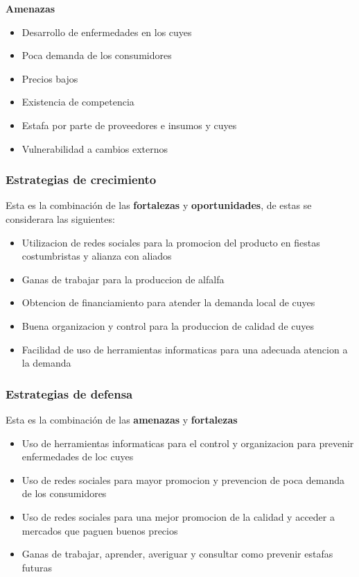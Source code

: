\documentclass[11pt]{article}
\begin{document}
\textbf{Amenazas}
\begin{itemize}
	\item Desarrollo de enfermedades en los cuyes  
	\item Poca demanda de los consumidores
	\item Precios bajos
	\item Existencia de competencia
    \item Estafa por parte de proveedores e insumos y cuyes
	\item Vulnerabilidad a cambios externos
\end{itemize}

\subsubsection{Estrategias de crecimiento}
Esta es la combinación de las \textbf{fortalezas} y \textbf{oportunidades}, de estas se considerara las siguientes:
\begin{itemize}
    \item Utilizacion de redes sociales para la promocion del producto en fiestas costumbristas y alianza con aliados
    \item Ganas de trabajar para la produccion de alfalfa
    \item Obtencion de financiamiento para atender la demanda local de cuyes
    \item Buena organizacion y control para la produccion de calidad de cuyes
    \item Facilidad de uso de herramientas informaticas para una adecuada atencion a la demanda
\end{itemize}

\subsubsection{Estrategias de defensa}
Esta es la combinación de las \textbf{amenazas} y \textbf{fortalezas}
\begin{itemize}
    \item Uso de herramientas informaticas para el control y organizacion para prevenir enfermedades de loc cuyes
    \item Uso de redes sociales para mayor promocion y prevencion de poca demanda de los consumidores
    \item Uso de redes sociales para una mejor promocion de la calidad y acceder a mercados que paguen buenos precios
    \item Ganas de trabajar, aprender, averiguar y consultar como prevenir estafas futuras
\end{itemize}
\end{document}
